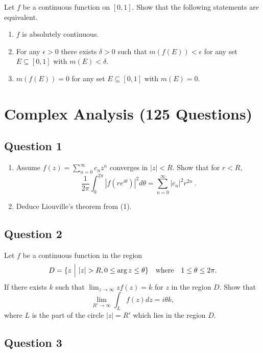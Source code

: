 \documentclass[12pt]{article}
\begin{document}
Let \(f\) be a continuous function on \([0,1]\). Show that the following
statements are equivalent.

\begin{enumerate}
\def\labelenumi{\arabic{enumi}.}
\item
  \(f\) is absolutely continuous.
\item
  For any \(\epsilon > 0\) there exists \(\delta > 0\) such that
  \(m(f(E)) < \epsilon\) for any set \(E\subseteq [0,1]\) with
  \(m(E) < \delta\).
\item
  \(m(f(E)) = 0\) for any set \(E \subseteq [0,1]\) with \(m(E)=0\).
\end{enumerate}

\hypertarget{complex-analysis-125-questions}{%
\section{Complex Analysis (125
Questions)}\label{complex-analysis-125-questions}}

\hypertarget{question-1-2}{%
\subsection{Question 1}\label{question-1-2}}

\begin{enumerate}
\def\labelenumi{(\arabic{enumi})}
\item
  Assume \(\displaystyle f(z) = \sum_{n=0}^\infty c_n z^n\) converges in
  \(|z| < R\). Show that for \(r <R\),
  \[\frac{1}{2 \pi} \int_0^{2 \pi} |f(r e^{i \theta})|^2 d \theta =
  \sum_{n=0}^\infty |c_n|^2 r^{2n} \; .\]
\item
  Deduce Liouville's theorem from (1).
\end{enumerate}

\hypertarget{question-2-2}{%
\subsection{Question 2}\label{question-2-2}}

Let \(f\) be a continuous function in the region
\[D=\{z {~\mathrel{\Big|}~}  {\left\lvert {z} \right\rvert}>R, 0\leq \arg z\leq \theta\}\quad\text{where}\quad
1\leq \theta \leq 2\pi.\] If there exists \(k\) such that
\(\displaystyle{\lim_{z\to\infty} zf(z)=k}\) for \(z\) in the region
\(D\). Show that \[\lim_{R'\to\infty} \int_{L} f(z) dz=i\theta k,\]
where \(L\) is the part of the circle \(|z|=R'\) which lies in the
region \(D\).

\hypertarget{question-3-2}{%
\subsection{Question 3}\label{question-3-2}}
\end{document}
